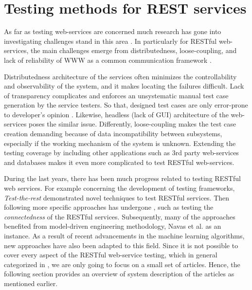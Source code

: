 \documentclass[english]{tktltiki}
\begin{document}
\section{Testing methods for REST services}
As far as testing web-services are concerned much research has gone into investigating challenges stand in this area \cite{canfora2009service, bozkurt2013testing}. In particularly for RESTful web-services, the main challenges emerge from distributedness, loose-coupling, and lack of reliability of WWW as a common communication framework \cite{chakrabarti2009test}. 

Distributedness architecture of the services often minimizes the controllability and observability of the system, and it makes locating the failures difficult. Lack of transparency complicates and enforces an unsystematic manual test case generation by the service testers. So that, designed test cases are only error-prone to developer's opinion \cite{navas2014rest}. Likewise, headless (lack of GUI) architecture of the web-services poses the similar issue. Differently, loose-coupling makes the test case creation demanding because of data incompatibility between subsystems, especially if the working mechanism of the system is unknown. Extending the testing coverage by including other applications such as 3rd party web-services and databases makes it even more complicated to test RESTful web-services.

During the last years, there has been much progress related to testing RESTful web services. For example concerning the development of testing frameworks, \textit{Test-the-rest} \cite{chakrabarti2009test} demonstrated novel techniques to test RESTful services. Then following more specific approaches has undergone \cite{chakrabarti2010connectedness}, such as testing the \textit{connectedness} of the RESTful services. Subsequently, many of the approaches benefited from model-driven engineering methodology, Navas et al. \cite{navas2014rest} as an instance. As a result of recent advancements in the machine learning algorithms, new approaches \cite{navas2014rest, arcuri2017restful} have also been adapted to this field. Since it is not possible to cover every aspect of the RESTful web-service testing, which in general categorized in \cite{canfora2009service, bozkurt2013testing}, we are only going to focus on a small set of articles. Hence, the following section provides an overview of system description of the articles as mentioned earlier.
\end{document}

